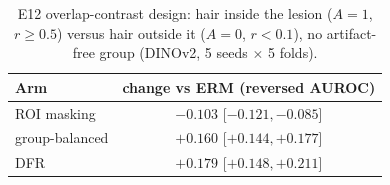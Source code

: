 \begin{table}[H]\centering\small
\caption{E12 overlap-contrast design: hair inside the lesion ($A{=}1$, $r\ge0.5$) versus hair outside it ($A{=}0$, $r<0.1$), no artifact-free group (DINOv2, 5 seeds $\times$ 5 folds).}\label{tab:e12}
\begin{tabular}{lc}\toprule
Arm & change vs ERM (reversed AUROC) \\\midrule
ROI masking & $-0.103$ [$-0.121, -0.085$] \\
group-balanced & $+0.160$ [$+0.144, +0.177$] \\
DFR & $+0.179$ [$+0.148, +0.211$] \\
\bottomrule\end{tabular}
\end{table}
